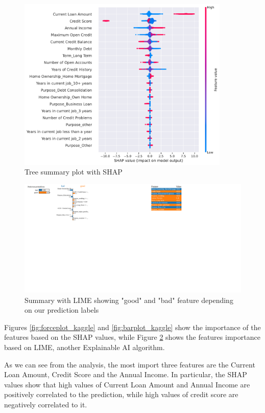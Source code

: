 \documentclass[12pt]{article}
\begin{document}
\begin{figure}[h!]
    \centering
    \includegraphics[width=0.9\textwidth]{images/summary_plot_kaggle.pdf}
    \caption{Tree summary plot with SHAP}
    \label{fig:treesum_kaggle}
\end{figure}


\begin{figure}[h!]
    \centering
    \includegraphics[width=1.\textwidth]{images/lime.pdf}
    \caption{Summary with LIME showing "good" and "bad" feature depending on our prediction labels}
    \label{fig:lime_kaggle}
\end{figure}

Figures \ref{fig:forceplot_kaggle} and \ref{fig:barplot_kaggle} show the importance of the features based on the SHAP values, while Figure \ref{fig:lime_kaggle} shows the features importance based on LIME, another Explainable AI algorithm. 

As we can see from the analysis, the most import three features are the Current Loan Amount, Credit Score and the Annual Income. In particular, the SHAP values show that high values of Current Loan Amount and Annual Income are positively correlated to the prediction, while high values of credit score are negatively correlated to it.
\end{document}
